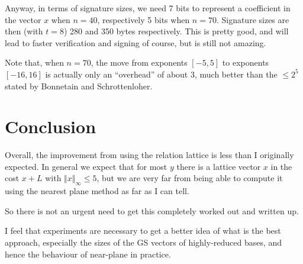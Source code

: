 \documentclass{llncs}
\begin{document}
Anyway, in terms of signature sizes, we need 7 bits to represent a coefficient in the vector $x$ when $n=40$, respectively 5 bits when $n=70$.
Signature sizes are then (with $t=8$) 280 and 350 bytes respectively.
This is pretty good, and will lead to faster verification and signing of course, but is still not amazing.

Note that, when $n=70$, the move from exponents $[-5,5]$ to exponents $[-16,16]$ is actually only an ``overhead'' of about 3, much better than the $\le 2^5$ stated by Bonnetain and Schrottenloher.


\section{Conclusion}

Overall, the improvement from using the relation lattice is less than I originally expected. In general we expect that for most $y$ there is a lattice vector $x$ in the cost $x + L$ with $\Vert x \Vert_\infty \le 5$, but we are very far from being able to compute it using the nearest plane method as far as I can tell.

So there is not an urgent need to get this completely worked out and written up.

I feel that experiments are necessary to get a better idea of what is the best approach, especially the sizes of the GS vectors of highly-reduced bases, and hence the behaviour of near-plane in practice.
\end{document}
